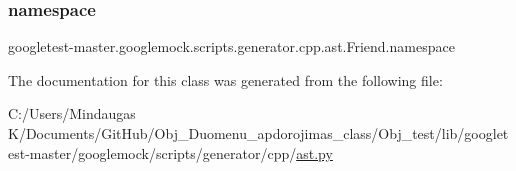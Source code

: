 \subsubsection{\texorpdfstring{namespace}{namespace}}
{\footnotesize\ttfamily googletest-\/master.\+googlemock.\+scripts.\+generator.\+cpp.\+ast.\+Friend.\+namespace}



The documentation for this class was generated from the following file\+:\begin{DoxyCompactItemize}
\item 
C\+:/\+Users/\+Mindaugas K/\+Documents/\+Git\+Hub/\+Obj\+\_\+\+Duomenu\+\_\+apdorojimas\+\_\+class/\+Obj\+\_\+test/lib/googletest-\/master/googlemock/scripts/generator/cpp/\mbox{\hyperlink{_obj__test_2lib_2googletest-master_2googlemock_2scripts_2generator_2cpp_2ast_8py}{ast.\+py}}\end{DoxyCompactItemize}
